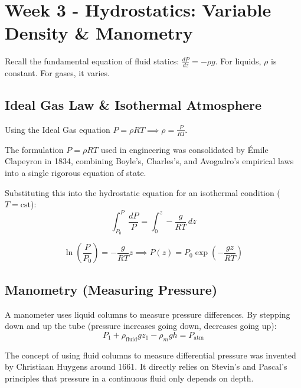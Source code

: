 \section{Week 3 - Hydrostatics: Variable Density \& Manometry}

Recall the fundamental equation of fluid statics: $\frac{dP}{dz} = -\rho g$. For liquids, $\rho$ is constant. For gases, it varies.

\subsection{Ideal Gas Law \& Isothermal Atmosphere}

Using the Ideal Gas equation $P = \rho RT \implies \rho = \frac{P}{RT}$.

\begin{conceptbox}
The formulation $P = \rho RT$ used in engineering was consolidated by Émile Clapeyron in 1834, combining Boyle's, Charles's, and Avogadro's empirical laws into a single rigorous equation of state.
\end{conceptbox}

Substituting this into the hydrostatic equation for an isothermal condition ($T = \text{cst}$):
\begin{equation*}
    \int_{P_{0}}^{P} \frac{dP}{P} = \int_{0}^{z} -\frac{g}{RT} \, dz
\end{equation*}

\begin{equation*}
    \ln\left(\frac{P}{P_{0}}\right) = -\frac{g}{RT}z \implies P(z) = P_{0}\exp\left(-\frac{gz}{RT}\right)
\end{equation*}

\subsection{Manometry (Measuring Pressure)}

A manometer uses liquid columns to measure pressure differences. By stepping down and up the tube (pressure increases going down, decreases going up): 
\begin{equation*}
    P_{1} + \rho_{\text{fluid}}gz_{1} - \rho_{m}gh = P_{\text{atm}}
\end{equation*}

\begin{conceptbox}
The concept of using fluid columns to measure differential pressure was invented by Christiaan Huygens around 1661. It directly relies on Stevin's and Pascal's principles that pressure in a continuous fluid only depends on depth.
\end{conceptbox}

